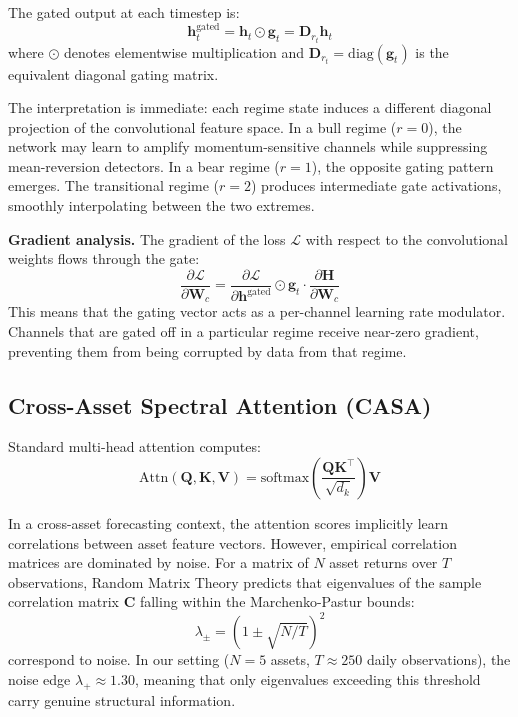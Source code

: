\documentclass[conference]{IEEEtran}
\begin{document}
The gated output at each timestep is:
\begin{equation}
\mathbf{h}_t^{\text{gated}} = \mathbf{h}_t \odot \mathbf{g}_t = \mathbf{D}_{r_t} \mathbf{h}_t
\label{eq:gated}
\end{equation}
where $\odot$ denotes elementwise multiplication and $\mathbf{D}_{r_t} = \text{diag}(\mathbf{g}_t)$ is the equivalent diagonal gating matrix.

The interpretation is immediate: each regime state induces a different diagonal projection of the convolutional feature space. In a bull regime ($r=0$), the network may learn to amplify momentum-sensitive channels while suppressing mean-reversion detectors. In a bear regime ($r=1$), the opposite gating pattern emerges. The transitional regime ($r=2$) produces intermediate gate activations, smoothly interpolating between the two extremes.

\textbf{Gradient analysis.} The gradient of the loss $\mathcal{L}$ with respect to the convolutional weights flows through the gate:
\begin{equation}
\frac{\partial \mathcal{L}}{\partial \mathbf{W}_c} = \frac{\partial \mathcal{L}}{\partial \mathbf{h}^{\text{gated}}} \odot \mathbf{g}_t \cdot \frac{\partial \mathbf{H}}{\partial \mathbf{W}_c}
\end{equation}
This means that the gating vector acts as a per-channel learning rate modulator. Channels that are gated off in a particular regime receive near-zero gradient, preventing them from being corrupted by data from that regime.

\subsection{Cross-Asset Spectral Attention (CASA)}
\label{sec:casa}

Standard multi-head attention computes:
\begin{equation}
\text{Attn}(\mathbf{Q}, \mathbf{K}, \mathbf{V}) = \text{softmax}\!\left(\frac{\mathbf{Q}\mathbf{K}^\top}{\sqrt{d_k}}\right)\mathbf{V}
\end{equation}

In a cross-asset forecasting context, the attention scores implicitly learn correlations between asset feature vectors. However, empirical correlation matrices are dominated by noise. For a matrix of $N$ asset returns over $T$ observations, Random Matrix Theory predicts that eigenvalues of the sample correlation matrix $\mathbf{C}$ falling within the Marchenko-Pastur bounds:
\begin{equation}
\lambda_{\pm} = \left(1 \pm \sqrt{N/T}\right)^2
\end{equation}
correspond to noise. In our setting ($N=5$ assets, $T \approx 250$ daily observations), the noise edge $\lambda_+ \approx 1.30$, meaning that only eigenvalues exceeding this threshold carry genuine structural information.
\end{document}
